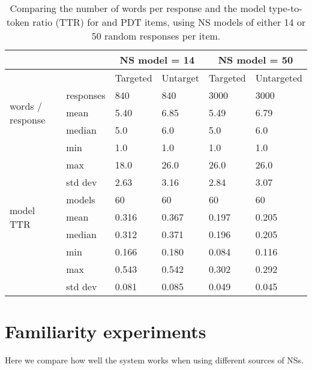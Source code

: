 \begin{table}[htb!]
\begin{center}
\setlength{\tabcolsep}{.6em}
\begin{tabular}{|l|l||l|l||l|l|}
\hline
 && \multicolumn{2}{c||}{NS model = 14} & \multicolumn{2}{c|}{NS model = 50} \\
\hline
	&	& Targeted 	& Untarget 	& Targeted 	& Untargeted  	\\
\hline
\multirow{3}{*}{\begin{sideways}words / response \end{sideways}} & responses & 840 & 840 & 3000 & 3000  \\
\cline{2-6}
& mean 		& 5.40 	& 6.85		& 5.49 	& 6.79	 \\
\cline{2-6}
& median 	& 5.0 	& 6.0		& 5.0 	& 6.0	\\
\cline{2-6}
& min 		& 1.0 	& 1.0		& 1.0 	& 1.0	 \\
\cline{2-6}
& max 		& 18.0 	& 26.0		& 26.0 	& 26.0	 \\
\cline{2-6}
& std dev 	& 2.63 	& 3.16		& 2.84 	& 3.07	 \\
\hline
\hline
\multirow{3}{*}{\begin{sideways} model TTR \end{sideways}} & models	& 60  & 60 & 60 & 60  \\
\cline{2-6}
& mean 		& 0.316 	& 0.367		& 0.197 	& 0.205	 \\
\cline{2-6}
& median 	& 0.312 	& 0.371		& 0.196 	& 0.205	\\
\cline{2-6}
& min 		& 0.166 	& 0.180		& 0.084 	& 0.116	 \\
\cline{2-6}
& max 		& 0.543 	& 0.542		& 0.302 	& 0.292	 \\
\cline{2-6}
& std dev 	& 0.081 	& 0.085		& 0.049 	& 0.045	 \\
\hline
\end{tabular}
\caption{\label{tab:targeting-model-stats}Comparing the number of words per response and the model type-to-token ratio (TTR) for  and  PDT items, using NS models of either 14 or 50 random responses per item.
}
\end{center}
\end{table}



\section{Familiarity experiments}
\label{sec:exp-familiarity}
Here we compare how well the system works when using different sources of NSs. 
